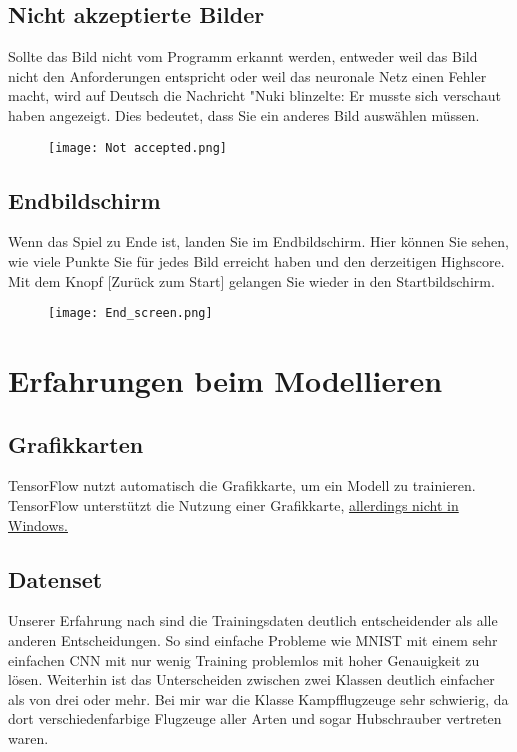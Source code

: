 \documentclass{article}
\begin{document}
\subsection{Nicht akzeptierte Bilder}
Sollte das Bild nicht vom Programm erkannt werden, entweder weil das Bild nicht den Anforderungen entspricht oder weil das neuronale Netz einen Fehler macht, wird auf Deutsch die Nachricht "Nuki blinzelte: Er musste sich verschaut haben angezeigt. Dies bedeutet, dass Sie ein anderes Bild auswählen müssen.
\begin{figure}[h]
\centering
\texttt{[image: Not accepted.png]}
\end{figure}

\subsection{Endbildschirm}
Wenn das Spiel zu Ende ist, landen Sie im Endbildschirm. Hier können Sie sehen, wie viele Punkte Sie für jedes Bild erreicht haben und den derzeitigen Highscore. Mit dem Knopf [Zurück zum Start] gelangen Sie wieder in den Startbildschirm.

\begin{figure}[h]
\centering
\texttt{[image: End\_screen.png]}
\end{figure}

\newpage
\section{Erfahrungen beim Modellieren}

\subsection{Grafikkarten}
TensorFlow nutzt automatisch die Grafikkarte, um ein Modell zu trainieren. TensorFlow unterstützt die Nutzung einer Grafikkarte, \href{https://www.tensorflow.org/install/pip#windows-native}{allerdings nicht in Windows.}

\subsection{Datenset}
Unserer Erfahrung nach sind die Trainingsdaten deutlich entscheidender als alle anderen Entscheidungen. So sind einfache Probleme wie MNIST mit einem sehr einfachen CNN mit nur wenig Training problemlos mit hoher Genauigkeit zu lösen. Weiterhin ist das Unterscheiden zwischen zwei Klassen deutlich einfacher als von drei oder mehr. Bei mir war die Klasse Kampfflugzeuge sehr schwierig, da dort verschiedenfarbige Flugzeuge aller Arten und sogar Hubschrauber vertreten waren.
\end{document}

